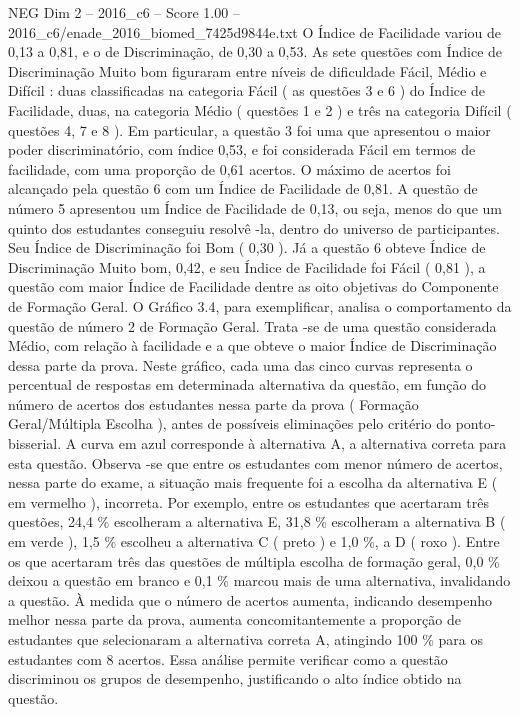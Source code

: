 \begin{textsample}{NEG Dim 2 – 2016\_c6 – Score 1.00 – 2016\_c6/enade\_2016\_biomed\_7425d9844e.txt}
O Índice de Facilidade variou de 0,13 a 0,81, e o de Discriminação, de 0,30 a 0,53.
As sete questões com Índice de Discriminação Muito bom figuraram entre níveis de dificuldade Fácil, Médio e Difícil : duas classificadas na categoria Fácil ( as questões 3 e 6 ) do Índice de Facilidade, duas, na categoria Médio ( questões 1 e 2 ) e três na categoria Difícil ( questões 4, 7 e 8 ).
Em particular, a questão 3 foi uma que apresentou o maior poder discriminatório, com índice 0,53, e foi considerada Fácil em termos de facilidade, com uma proporção de 0,61 acertos.
O máximo de acertos foi alcançado pela questão 6 com um Índice de Facilidade de 0,81.
A questão de número 5 apresentou um Índice de Facilidade de 0,13, ou seja, menos do que um quinto dos estudantes conseguiu resolvê -la, dentro do universo de participantes.
Seu Índice de Discriminação foi Bom ( 0,30 ).
Já a questão 6 obteve Índice de Discriminação Muito bom, 0,42, e seu Índice de Facilidade foi Fácil ( 0,81 ), a questão com maior Índice de Facilidade dentre as oito objetivas do Componente de Formação Geral.
O Gráfico 3.4, para exemplificar, analisa o comportamento da questão de número 2 de Formação Geral.
Trata -se de uma questão considerada Médio, com relação à facilidade e a que obteve o maior Índice de Discriminação dessa parte da prova.
Neste gráfico, cada uma das cinco curvas representa o percentual de respostas em determinada alternativa da questão, em função do número de acertos dos estudantes nessa parte da prova ( Formação Geral/Múltipla Escolha ), antes de possíveis eliminações pelo critério do ponto-bisserial.
A curva em azul corresponde à alternativa A, a alternativa correta para esta questão.
Observa -se que entre os estudantes com menor número de acertos, nessa parte do exame, a situação mais frequente foi a escolha da alternativa E ( em vermelho ), incorreta.
Por exemplo, entre os estudantes que acertaram três questões, 24,4 \% escolheram a alternativa E, 31,8 \% escolheram a alternativa B ( em verde ), 1,5 \% escolheu a alternativa C ( preto ) e 1,0 \%, a D ( roxo ).
Entre os que acertaram três das questões de múltipla escolha de formação geral, 0,0 \% deixou a questão em branco e 0,1 \% marcou mais de uma alternativa, invalidando a questão.
À medida que o número de acertos aumenta, indicando desempenho melhor nessa parte da prova, aumenta concomitantemente a proporção de estudantes que selecionaram a alternativa correta A, atingindo 100 \% para os estudantes com 8 acertos.
Essa análise permite verificar como a questão discriminou os grupos de desempenho, justificando o alto índice obtido na questão.

\end{textsample}
